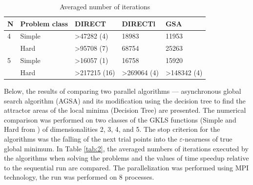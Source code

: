\documentclass{svproc}
\begin{document}
\begin{table}[!ht]
    \caption{Averaged number of iterations}
    \label{tab:1}
    \centering
    \begin{tabular}{|l|l|l|l|l|}
    \hline
        N & Problem class & DIRECT & DIRECTl & GSA  \\ \hline
        4 & Simple & >47282 (4) & 18983 & 11953  \\ \hline
        ~ & Hard & >95708 (7) & 68754 & 25263  \\ \hline
        5 & Simple & >16057 (1) & 16758 & 15920  \\ \hline
        ~ & Hard & >217215 (16) & >269064 (4) & >148342 (4)  \\ \hline
    \end{tabular}
\end{table}




Below, the results of comparing two parallel algorithms --- asynchronous global search algorithm  (AGSA) and its modification using the decision tree to find the attractor areas of the local minima  (Decision Tree) are presented. The numerical comparison was performed on two classes of the GKLS  functions (Simple and Hard from \cite{Sergeyev2006}) of dimensionalities 2, 3, 4, and 5. The stop  criterion for the algorithms was the falling of the next trial points into the $\varepsilon$-nearness of  true global minimum.  In Table \ref{tab:2}, the averaged numbers of iterations executed by the algorithms when solving the  problems and the values of time speedup relative to the sequential run are compared. The parallelization was performed using MPI technology, the run was performed on 8 processes.
\end{document}
